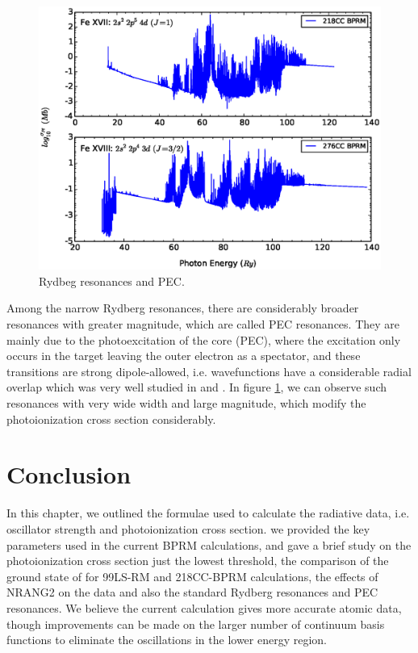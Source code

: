 \begin{figure}
	\centering
	\includegraphics[width=.9\textwidth]{figures_chap_4/resonances}	
	\caption{Rydbeg resonances and PEC.}
	\label{figure_resonances}
\end{figure}

Among the narrow Rydberg resonances, there are considerably broader resonances with greater magnitude, which are called PEC resonances. They are mainly due to the photoexcitation of the core (PEC), where the excitation only occurs in the target leaving the outer electron as a spectator, and these transitions are strong dipole-allowed, i.e. wavefunctions have a considerable radial overlap which was very well studied in \citet{opcd_4} and \citet{pec_2}. In figure \ref{figure_resonances}, we can observe such resonances with very wide width and large magnitude, which modify the photoionization cross section considerably.

\section{Conclusion}
In this chapter, we outlined the formulae used to calculate the radiative data, i.e. oscillator strength and photoionization cross section. we provided the key parameters used in the current BPRM calculations, and gave a brief study on the photoionization cross section just the lowest threshold, the comparison of the ground state of  for 99LS-RM and 218CC-BPRM calculations, the effects of NRANG2 on the data and also the standard Rydberg resonances and PEC resonances. We believe the current calculation gives more accurate atomic data, though improvements can be made on the larger number of continuum basis functions to eliminate the oscillations in the lower energy region.



